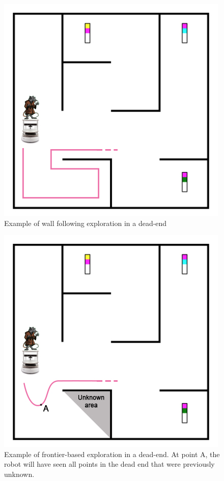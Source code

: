 \documentclass[titlepage,12pt,a4paper]{article}
\begin{document}
\begin{figure}
	\centering
	\includegraphics[scale=0.5]{wallfollowpath.jpg}
	\caption{Example of wall following exploration in a dead-end}
\end{figure}

\begin{figure}
	\centering
	\includegraphics[scale=0.5]{searchpath.jpg}
	\caption{Example of frontier-based exploration in a dead-end. At point A, the robot will have seen all points in the dead end that were previously unknown.}
\end{figure}
\end{document}
